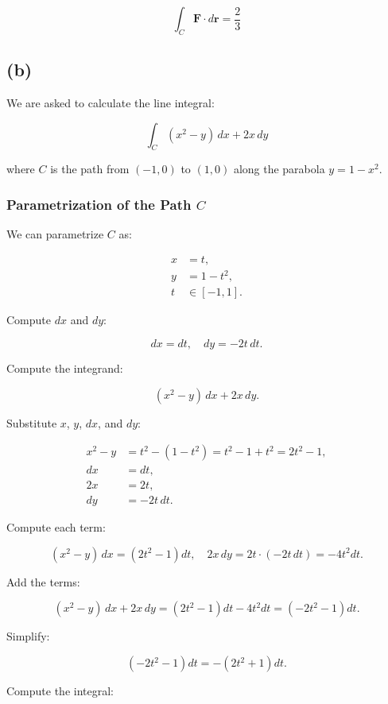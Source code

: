 \documentclass[11pt]{article}
\begin{document}
\[
\int_{C} \mathbf{F} \cdot d\mathbf{r} = \frac{2}{3}
\]

\newpage

\subsection{(b)}

We are asked to calculate the line integral:

\[
\int_{C} (x^2 - y) \, dx + 2x \, dy
\]

where $C$ is the path from $(-1, 0)$ to $(1, 0)$ along the parabola $y = 1 - x^2$.

\newpage

\subsubsection{Parametrization of the Path $C$}

We can parametrize $C$ as:

\[
\begin{aligned}
x &= t, \\
y &= 1 - t^2, \\
t &\in [-1, 1].
\end{aligned}
\]

Compute $dx$ and $dy$:

\[
dx = dt, \quad dy = -2t \, dt.
\]

Compute the integrand:

\[
(x^2 - y) \, dx + 2x \, dy.
\]

Substitute $x$, $y$, $dx$, and $dy$:

\[
\begin{aligned}
x^2 - y &= t^2 - (1 - t^2) = t^2 - 1 + t^2 = 2t^2 - 1, \\
dx &= dt, \\
2x &= 2t, \\
dy &= -2t \, dt.
\end{aligned}
\]

Compute each term:

\[
(x^2 - y) \, dx = (2t^2 - 1) dt, \quad 2x \, dy = 2t \cdot (-2t \, dt) = -4t^2 dt.
\]

Add the terms:

\[
(x^2 - y) \, dx + 2x \, dy = (2t^2 - 1) dt - 4t^2 dt = (-2t^2 - 1) dt.
\]

Simplify:

\[
(-2t^2 - 1) dt = -(2t^2 + 1) dt.
\]

Compute the integral:
\end{document}
